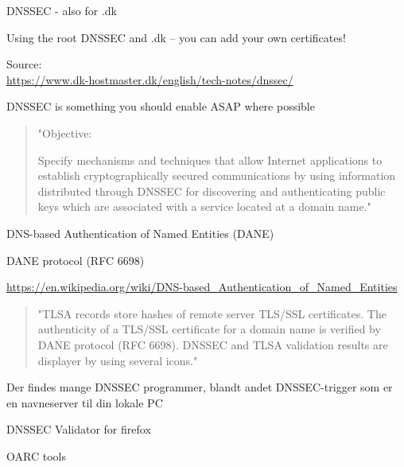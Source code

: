 \documentclass[Screen16to9,17pt]{foils}
\begin{document}
\centerline{DNSSEC - also for .dk}

Using the root DNSSEC and .dk -- you can add your own certificates!

Source:\\
\url{https://www.dk-hostmaster.dk/english/tech-notes/dnssec/}


DNSSEC is something you should enable ASAP where possible


\begin{quote}
"Objective:

Specify mechanisms and techniques that allow Internet applications to
establish cryptographically secured communications by using information
distributed through DNSSEC for discovering and authenticating public
keys which are associated with a service located at a domain name."
\end{quote}

\begin{list1}
\item DNS-based Authentication of Named Entities (DANE)
\item DANE protocol (RFC 6698)
\item {\footnotesize\url{https://en.wikipedia.org/wiki/DNS-based_Authentication_of_Named_Entities}}
\end{list1}




\begin{quote}
"TLSA records store hashes of remote server TLS/SSL certificates. The authenticity of a TLS/SSL certificate for a domain name is verified by DANE protocol (RFC 6698). DNSSEC and TLSA validation results are displayer by using several icons."
\end{quote}








Der findes mange DNSSEC programmer, blandt andet DNSSEC-trigger som er en navneserver til din lokale PC

\begin{list2}
\item DNSSEC Validator for firefox\\ 
\item OARC tools 
\item {}
\end{list2}
\end{document}
